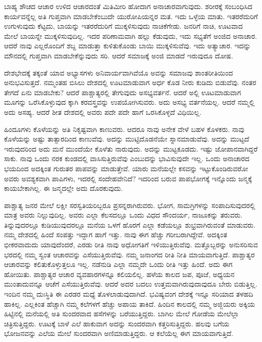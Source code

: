 ಬಾಹ್ಯ ಶೌಚದ ಆಚಾರ ಉಳಿದ ಆಚಾರದಂತೆ ಮಿತಿಮೀರಿ ಹೋದಾಗ ಅನಾಚಾರ\break ವಾಗುವುದು. ಶರೀರಕ್ಕೆ ಸಂಬಂಧಿಸಿದ ಕಾರ್ಯವನ್ನೆಲ್ಲ ಅತಿ ಗುಪ್ತವಾಗಿ ಮಾಡಬೇಕೆಂಬುದೇ ಯುರೋಪಿಯನ್ನರ ಮತ. ಇದು ಒಳ್ಳೆಯ ಮಾತು. ಇತರರೆದುರಿಗೆ ಉಗುಳುವುದು ಕೆಟ್ಟದು, ಬಾಯನ್ನು ಇತರರೆದುರಿಗೆ ಮುಕ್ಕಳಿಸುವುದು ನಾಚಿಕೆಗೇಡು. ಜನರಿಗೆ ನಾಚಿ, ಊಟವಾದ ಮೇಲೆ ಬಾಯನ್ನೇ ಮುಕ್ಕಳಿಸುವುದಿಲ್ಲ. ಇದರ ಪರಿಣಾಮವಾಗಿ ಹಲ್ಲು ಕೆಡುವುದು, ಇದು ಸಭ್ಯತೆಗೆ ಅಂಜಿದ ಅನಾಚಾರ. ಆದರೆ ನಾವು ಎಲ್ಲರೊಂದಿಗೆ ಶಬ್ದ ಮಾಡುತ್ತಾ ಕುಳಿತುಕೊಂಡು ಬಾಯಿ ಮುಕ್ಕಳಿಸುವೆವು. ಇದು ಅತ್ಯಾಚಾರ. ಇದನ್ನು ಮೌನದಲ್ಲಿ ಗುಪ್ತವಾಗಿ ಮಾಡಬೇಕೆನ್ನುವುದು ಸರಿ. ಆದರೆ ಸಮಾಜಕ್ಕೆ ಅಂಜಿ ಮಾಡದೆ ಇರುವುದೂ ದೋಷ.

ದೇಶಭೇದಕ್ಕೆ ತಕ್ಕಂತೆ ಯಾವ ಅಭ್ಯಾಸಗಳು ಅನಿವಾರ್ಯವಾಗಿವೆಯೊ ಅವನ್ನು ಸಮಾಜವು ಶಾಂತರೀತಿಯಿಂದ ಅನುಭವಿಸುತ್ತದೆ. ನಮ್ಮಂತಹ ಬಿಸಿಲು ದೇಶದಲ್ಲಿ ಊಟ\break ಮಾಡುವಾಗ ಅರ್ಧ ಕೊಡ ನೀರು ಕುಡಿದು ಬಿಡುವೆವು. ನಂತರ ತೇಗದೆ ಏನು ಮಾಡಬೇಕು? ಆದರೆ ಪಾಶ್ಚಾತ್ಯರಲ್ಲಿ ತೇಗುವುದು ಅಸಭ್ಯವರ್ತನೆ. ಆದರೆ ಅಲ್ಲಿ ಊಟಮಾಡುವಾಗ ಮೂಗನ್ನು ಒರೆಸಿಕೊಳ್ಳುವುದ ಕ್ಕಾಗಿ ಕರವಸ್ತ್ರವನ್ನು ಉಪಯೋಗಿಸುವರು. ಅದು ಅಸಭ್ಯ ವರ್ತನೆಯಲ್ಲ. ಆದರೆ ನಮ್ಮಲ್ಲಿ ಅದು ಅಸಹ್ಯ. ಆದರೆ ಶೀತ ದೇಶದಲ್ಲಿ ಅವರು ಪದೇ ಪದೇ ಹಾಗೆ ಒರಸಿಕೊಳ್ಳದೆ ವಿಧಿಯಿಲ್ಲ.

ಹಿಂದೂಗಳು ಕೊಳೆಯನ್ನು ಅತಿ ನಿಕೃಷ್ಟವಾಗಿ ಕಾಣುವರು. ಆದರೂ ನಾವು ಅನೇಕ ವೇಳೆ ಬಹಳ ಕೊಳಕರು. ನಾವು ಕೊಳೆಯನ್ನು ಅಷ್ಟು ತಾತ್ಸಾರದಿಂದ ಕಾಣುವೆವು. ಅದನ್ನು ಮುಟ್ಟಿದೊಡನೆಯೇ ಸ್ನಾನಮಾಡುವೆವು. ಅದನ್ನು ಮುಟ್ಟದೆ ಇರುವುದರಿಂದ ಅದು ಮನೆ ಮುಂದೆಯೇ ಕೊಳೆತು ನಾರುವುದು. ಅದನ್ನು ಮುಟ್ಟಕೂಡದು. ಇಷ್ಟು ಜೋಪಾನವಾಗಿದ್ದರೆ ಸಾಕು. ನಾವು ಒಂದು ನರಕ ಕುಂಡದಲ್ಲಿ ವಾಸಿಸುತ್ತಿರುವೆವು ಎಂಬುದನ್ನು ಭಾವಿಸುವುದೇ ಇಲ್ಲ. ಒಂದು ಅನಾಚಾರದ ಭಯದಿಂದ ಅದಕ್ಕಿಂತ ಗುರುತರ ಪಾಪವನ್ನು ಮಾಡುತ್ತೇವೆ. ಯಾರು ಮನೆಯಲ್ಲೇ ಕಸವನ್ನು ಇಟ್ಟುಕೊಂಡಿರುವರೋ ಅವರು ಅವಶ್ಯಕವಾಗಿ ಪಾಪಿಗಳು, ಇದರಲ್ಲಿ ಸಂದೇಹವೇನಿದೆ? ಇದರಿಂದ ಬರುವ ಪಾಪಭೋಗಕ್ಕೆ ಇನ್ನೊಂದು ಜನ್ಮಕ್ಕೆ ಕಾಯಬೇಕಾಗಿಲ್ಲ. ಈ ಜನ್ಮದಲ್ಲೇ ಅದು ದೊರಕುವುದು.

ಪಾಶ್ಚಾತ್ಯ ಜನರ ಮೇಲೆ ಲಕ್ಷೀ ಸರಸ್ವತಿಯರಿಬ್ಬರೂ ಪ್ರಸನ್ನರಾಗಿರುವರು. ಭೋಗ, ಸಾಮಗ್ರಿಗಳನ್ನು ಸಂಪಾದಿಸುವುದರಲ್ಲಿ ಮಾತ್ರ ಅವರು ನಿಲ್ಲುವುದಿಲ್ಲ. ಅವರು ಎಲ್ಲಾ ಕೆಲಸದಲ್ಲೂ ಒಂದು ವಿಧದ ಸೌಂದರ್ಯ, ನಾಜೂಕನ್ನು ತರುವರು. ತಿನ್ನುವುದರಲ್ಲೂ ಕುಡಿಯುವುದರಲ್ಲೂ ಮನೆಯ ಒಳಗೆ ಹೊರಗೆ ಎಲ್ಲಾ ಕಡೆಯಲ್ಲೂ ಶುಭ್ರವಾಗಿರುವಂತೆ ಮಾಡುವರು. ನಮ್ಮ ದೇಶದಲ್ಲಿ ಹಿಂದೆ ಸಂಪತ್ತು ಇದ್ದಾಗ ಹಾಗೆ ಇತ್ತು. ನಾವು ಈಗ ಹೆಚ್ಚು ಗರೀಬರಾಗಿದ್ದೇವೆ. ಅದಕ್ಕಿಂತ ಭೀಕರವಾದುದು ಯಾವುದೆಂದರೆ, ಎರಡು ರೀತಿ ನಾವು ಅಧೋಗತಿಗೆ ಇಳಿಯುತ್ತಿರುವೆವು. ಮತ್ತೊಬ್ಬರನ್ನು ಅನುಸರಿಸುವ ಭರದಲ್ಲಿ ನಮ್ಮ ಸ್ವಂತ ಆಚಾರವನ್ನು ಎಸೆಯುತ್ತಿರುವೆವು. ನಮ್ಮ ಜನಾಂಗದ ರೀತಿ ನೀತಿ ಮಾಯವಾಗುತ್ತಿದೆ. ಪಾಶ್ಚಾತ್ಯರ ಆಚಾರವನ್ನು ಕಲಿತುಕೊಳ್ಳುತ್ತಲೂ ಇಲ್ಲ. ನಡೆನುಡಿ ಎಲ್ಲಾ ನಮ್ಮದೇ ಒಂದು ರೀತಿ ಇತ್ತು ಹಿಂದೆ. ಅದು ಈಗ ಹೋಯಿತು. ಪಾಶ್ಚಾತ್ಯರ ಆಚಾರ ವ್ಯವಹಾರಗಳನ್ನೂ ಕಲಿಯಲಿಲ್ಲ. ಹಳೆಯ ಕಾಲದ ಜಪ, ಪೂಜೆ, ಅಧ್ಯಯನ ಮುಂತಾದುವನ್ನೂ ಆಚೆಗೆ ಎಸೆಯುತ್ತಿರುವೆವು. ಆದರೆ ಅದರ ಬದಲು ಉತ್ತಮವಾಗಿರುವುದಾವುದೂ ಬೇರು ಬಿಡುತ್ತಿಲ್ಲ. ಇಂದಿನ ನಮ್ಮ ದುಃಸ್ಥಿತಿ ಈ ಎರಡರ ಮಧ್ಯೆ ತೊಳಲಾಡುವುದಾಗಿದೆ. ಭವಿಷ್ಯವಂಗ ದೇಶಕ್ಕೆ ಇನ್ನೂ ಸರಿಯಾದ ತಳಹದಿ ಹಾಕಿಲ್ಲ. ಎಲ್ಲಕಿಂತ ಹೆಚ್ಚಾಗಿ ನಮ್ಮ ಕಲೆಗಳಗೆ ಹೆಚ್ಚು ಅಪಾಯ ತಾಕಿದೆ. ಹಿಂದಿನ ಕಾಲದಲ್ಲಿ ನಮ್ಮ ಅಜ್ಜಿಯರು ಅಕ್ಕಿಯ ಹಿಟ್ಟಿನಲ್ಲಿ ಮನೆಯಲ್ಲಿ ಅತಿ ಸುಂದರವಾದ ಹಸೆಗಳನ್ನು ಬರೆಯುತ್ತಿದ್ದರು. ಬಾಗಿಲ ಮೇಲೆ ಗೋಡೆಯ ಮೇಲೆಲ್ಲಾ ಚಿತ್ರಿಸುತ್ತಿದ್ದರು. ಊಟಕ್ಕೆ ಬಾಳೆ ಎಲೆ ಹಾಕುವಾಗ ಅದನ್ನು ಸುಂದರವಾಗಿ ಕತ್ತರಿಸುತ್ತಿದ್ದರು. ಹಲವು ಬಗೆಯ ಭೋಜನವನ್ನು ಎಲೆಯ ಮೇಲೆ ಸುಂದರವಾಗಿ ಅಣಿಮಾಡುತ್ತಿದ್ದರು. ಆ ಕಲೆಯೆಲ್ಲ ಈಗ ಮಾಯವಾಗುತ್ತಿದೆ.

